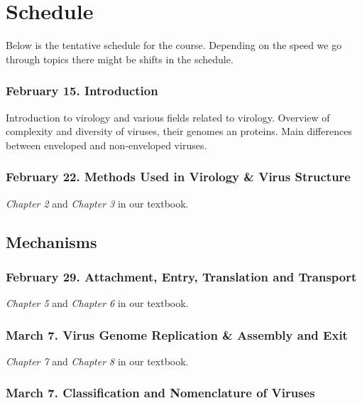 \section{Schedule}\label{schedule}

Below is the tentative schedule for the course. Depending on the speed
we go through topics there might be shifts in the schedule.

\subsubsection{February 15.
Introduction}\label{february-15.-introduction}

Introduction to virology and various fields related to virology.
Overview of complexity and diversity of viruses, their genomes an
proteins. Main differences between enveloped and non-enveloped viruses.

\subsubsection{February 22. Methods Used in Virology \& Virus
Structure}\label{february-22.-methods-used-in-virology-virus-structure}

\emph{Chapter 2} and \emph{Chapter 3} in our textbook.

\subsection{Mechanisms}\label{mechanisms}

\subsubsection{February 29. Attachment, Entry, Translation and
Transport}\label{february-29.-attachment-entry-translation-and-transport}

\emph{Chapter 5} and \emph{Chapter 6} in our textbook.

\subsubsection{March 7. Virus Genome Replication \& Assembly and
Exit}\label{march-7.-virus-genome-replication-assembly-and-exit}

\emph{Chapter 7} and \emph{Chapter 8} in our textbook.

\subsubsection{March 7. Classification and Nomenclature of
Viruses}\label{march-7.-classification-and-nomenclature-of-viruses}


